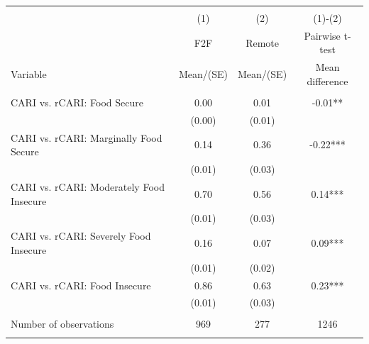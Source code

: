 
\begin{tabular}{@{\extracolsep{5pt}}lccc}
\\[-1.8ex]\hline \hline \\[-1.8ex]
 & \multicolumn{1}{c}{(1)}  & \multicolumn{1}{c}{(2)}  & \multicolumn{1}{c}{(1)-(2)} \\
 & \multicolumn{1}{c}{F2F}  & \multicolumn{1}{c}{Remote}  & \multicolumn{1}{c}{Pairwise t-test}  \\
Variable & Mean/(SE) & Mean/(SE) & Mean difference \\ \hline \\[-1.8ex] 
CARI vs. rCARI: Food Secure   & 0.00    & 0.01    & -0.01**   \\
 & (0.00)  & (0.01)  &  \\ [1ex]
CARI vs. rCARI: Marginally Food Secure   & 0.14    & 0.36    & -0.22***   \\
 & (0.01)  & (0.03)  &  \\ [1ex]
CARI vs. rCARI: Moderately Food Insecure   & 0.70    & 0.56    & 0.14***   \\
 & (0.01)  & (0.03)  &  \\ [1ex]
CARI vs. rCARI: Severely Food Insecure   & 0.16    & 0.07    & 0.09***   \\
 & (0.01)  & (0.02)  &  \\ [1ex]
CARI vs. rCARI: Food Insecure   & 0.86    & 0.63    & 0.23***   \\
 & (0.01)  & (0.03)  &  \\ [1ex]
\hline \\[-1.8ex]
Number of observations  & 969   & 277  & 1246  \\
\hline \hline \\[-1.8ex]

\end{tabular}
